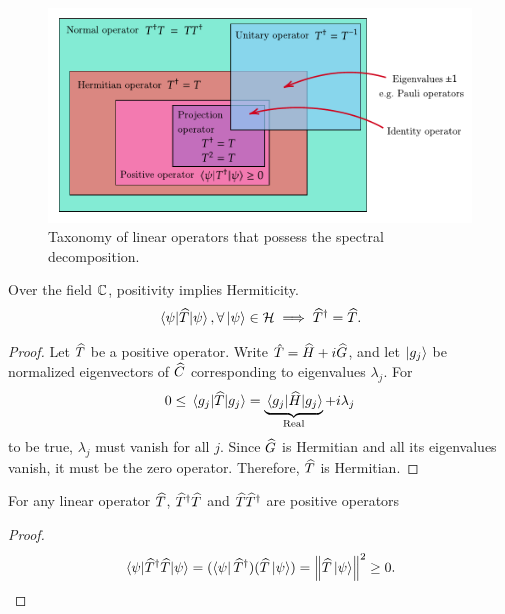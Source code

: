 \begin{figure}[h]
	\centering
	\includegraphics[scale=1]{fig/operator-classification.pdf}
	\caption{Taxonomy of linear operators that possess the spectral decomposition.}
	\label{fig:taxonomy}
\end{figure}

\begin{lemma}\label{}
	Over the field $\mathbb C$, positivity implies Hermiticity.
	\begin{align}
		\expval{\widehat{T}}{\psi}, \forall\ket{\psi}\in\mathcal{H} \implies \widehat{T}^{\dagger} = \widehat{T}.
	\end{align}
\end{lemma}
\begin{proof}
 	Let $\widehat{T}$ be a positive operator. Write $\hat T = \widehat{H} + i\widehat{G}$, and let $\ket{g_j}$ be normalized eigenvectors of $\widehat{C}$ corresponding to eigenvalues $\lambda_j$. For
 	\begin{align}
 		0 \le \expval{\widehat{T}}{g_j} = \underbrace{\expval{\widehat{H}}{g_j}}_{\textrm{Real}} + i\lambda_j 
 	\end{align}
 	to be true, $\lambda_j$ must vanish for all $j$. Since $\widehat{G}$ is Hermitian and all its eigenvalues vanish, it must be the zero operator. Therefore, $ \widehat{T}$ is Hermitian.
\end{proof}

\begin{lemma}\label{}
	For any linear operator $\widehat{T}$, $\widehat{T}^{\dagger}\widehat{T}$ and $\widehat{T}\widehat{T}^{\dagger}$ are positive operators
\end{lemma}
\begin{proof}
	\begin{align}
		\expval{\widehat{T}^{\dagger}\widehat{T}}{\psi} = (\bra{\psi} \widehat{T}^{\dagger})(\widehat{T}\ket{\psi}) = \norm{\widehat{T}\ket{\psi}}^2 \ge 0.
	\end{align}
\end{proof}

